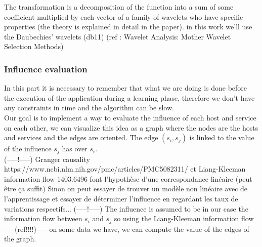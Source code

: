 \documentclass[10pt,a4paper,oneside]{article}
\begin{document}
\begin{multicols}{2}
The transformation is a decomposition of the function into a sum of some coefficient multiplied by each vector of a family of wavelets who have specific properties (the theory is explained in detail in the paper). in this work we'll use the Daubechies' wavelets (db11) (ref : Wavelet Analysis: Mother Wavelet Selection Methods)
\subsubsection{Influence evaluation}
In this part it is necessary to remember that what we are doing is done before the execution of the application during a learning phase, therefore we don't have any constraints in time and the algorithm can be slow.
\\
Our goal is to implement a way to evaluate the influence of each host and service on each other, we can visualize this idea as a graph where the nodes are the hosts and services and the edges are oriented. The edge $(s_i,s_j)$ is linked to the value of the influence $s_j$ has over $s_i$.
\\
(-----!-----)
Granger causality https://www.ncbi.nlm.nih.gov/pmc/articles/PMC5082311/ et Liang-Kleeman information flow 1403.6496 font l'hypothèse d'une correspondance linéaire (peut être ça suffit)
Sinon on peut essayer de trouver un modèle non linéaire avec de l'apprentissage et essayer de déterminer l'influence en regardant les taux de variations respectifs...
(-----!-----)
The influence is assumed to be in our case the information flow between $s_i$ and $s_j$ so using the Liang-Kleeman information flow -----(ref!!!!)----- on some data we have, we can compute the value of the edges of the graph.

\end{multicols}
\end{document}
